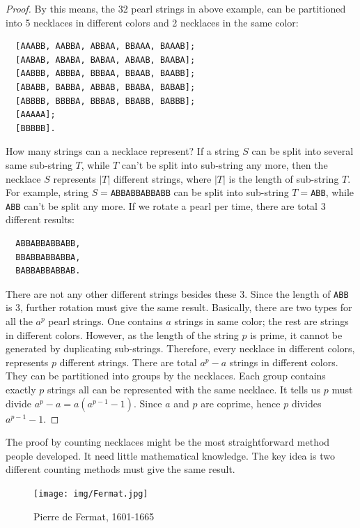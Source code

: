 \documentclass[b5paper]{article}
\begin{document}
\begin{proof}
By this means, the 32 pearl strings in above example, can be partitioned into 5 necklaces in different colors and 2 necklaces in the same color:

\begin{verbatim}
  [AAABB, AABBA, ABBAA, BBAAA, BAAAB];
  [AABAB, ABABA, BABAA, ABAAB, BAABA];
  [AABBB, ABBBA, BBBAA, BBAAB, BAABB];
  [ABABB, BABBA, ABBAB, BBABA, BABAB];
  [ABBBB, BBBBA, BBBAB, BBABB, BABBB];
  [AAAAA];
  [BBBBB].
\end{verbatim}

How many strings can a necklace represent? If a string $S$ can be split into several same sub-string $T$, while $T$ can't be split into sub-string any more, then the necklace $S$ represents $|T|$ different strings, where $|T|$ is the length of sub-string $T$. For example, string $S=$\texttt{ABBABBABBABB} can be split into sub-string $T=$\texttt{ABB}, while \texttt{ABB} can't be split any more. If we rotate a pearl per time, there are total 3 different results:

\begin{verbatim}
  ABBABBABBABB,
  BBABBABBABBA,
  BABBABBABBAB.
\end{verbatim}

There are not any other different strings besides these 3. Since the length of \texttt{ABB} is 3, further rotation must give the same result. Basically, there are two types for all the $a^p$ pearl strings. One contains $a$ strings in same color; the rest are strings in different colors. However, as the length of the string $p$ is prime, it cannot be generated by duplicating sub-strings. Therefore, every necklace in different colors, represents $p$ different strings. There are total $a^p -a$ strings in different colors. They can be partitioned into groups by the necklaces. Each group contains exactly $p$ strings all can be represented with the same necklace. It tells us $p$ must divide $a^p-a = a(a^{p-1}-1)$. Since $a$ and $p$ are coprime, hence $p$ divides $a^{p-1}-1$.

\end{proof}

The proof by counting necklaces might be the most straightforward method people developed. It need little mathematical knowledge. The key idea is two different counting methods must give the same result.

\begin{figure}
  \centering %
 \texttt{[image: img/Fermat.jpg]}
 \captionsetup{labelformat=empty}
 \caption{Pierre de Fermat, 1601-1665}
 \label{fig:Fermat}
\end{figure}
\end{document}
